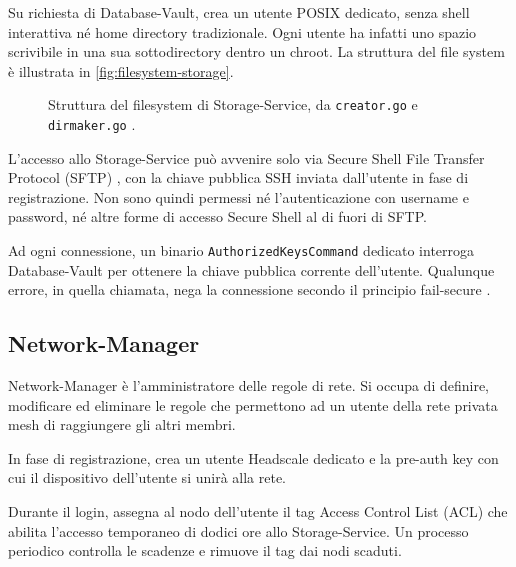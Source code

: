 Su richiesta di Database-Vault, crea un utente POSIX dedicato, senza shell interattiva né home directory
tradizionale. Ogni utente ha infatti uno spazio scrivibile in una sua sottodirectory dentro un chroot.
La struttura del file system è illustrata in \autoref{fig:filesystem-storage}.

\begin{figure}[H]
    \centering
    \begin{minipage}{0.85\linewidth}
    \end{minipage}
    \caption{Struttura del filesystem di Storage-Service, da \texttt{creator.go} e \texttt{dirmaker.go}
    \cite{ramusb-code-posixuser-owners,ramusb-code-posixuser-modes}.}
    \label{fig:filesystem-storage}
\end{figure}

L'accesso allo Storage-Service può avvenire solo via Secure Shell File Transfer Protocol (SFTP) \cite{sftp-filexfer}, 
con la chiave pubblica SSH inviata dall'utente in fase di registrazione. Non sono quindi permessi né 
l'autenticazione con username e password, né altre forme di accesso Secure Shell al di fuori di SFTP.

Ad ogni connessione, un binario \texttt{AuthorizedKeysCommand} dedicato interroga Database-Vault per 
ottenere la chiave pubblica corrente dell'utente.
Qualunque errore, in quella chiamata, nega la connessione secondo il principio fail-secure \cite{owasp-fail-securely}.

\subsection{Network-Manager}

Network-Manager è l'amministratore delle regole di rete. Si occupa di definire, modificare ed eliminare le 
regole che permettono ad un utente della rete privata mesh di raggiungere gli altri membri.

In fase di registrazione, crea un utente Headscale dedicato e la pre-auth key con cui il dispositivo 
dell'utente si unirà alla rete.

Durante il login, assegna al nodo dell'utente il tag Access Control List (ACL) che abilita l'accesso 
temporaneo di dodici ore allo Storage-Service.
Un processo periodico controlla le scadenze e rimuove il tag dai nodi scaduti.

